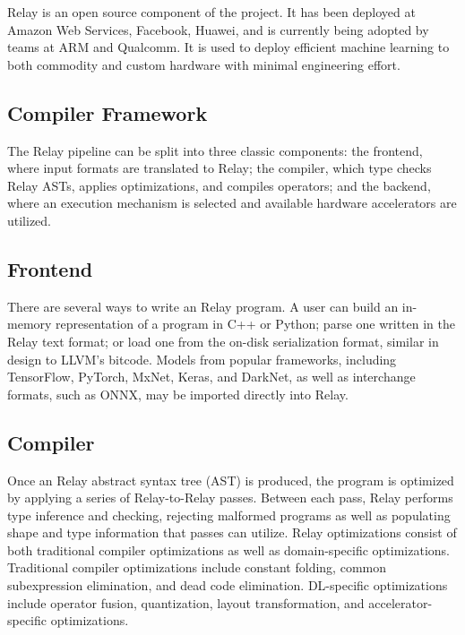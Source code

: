 Relay is an open source component of the \tvm project.
It has been deployed at Amazon Web Services, Facebook, Huawei,
  and is currently being adopted by teams at ARM and Qualcomm.
It is used to deploy efficient machine learning to
  both commodity and custom hardware with minimal
  engineering effort.

\subsection{Compiler Framework}
  The Relay pipeline can be split into three classic components:
    the frontend, where input formats are translated to Relay;
    the compiler, which type checks Relay ASTs, applies optimizations,
      and compiles operators;
    and the backend, where an execution mechanism is selected and
      available hardware accelerators are utilized.

  \subsection{Frontend}

  There are several ways to write an Relay program.
  A user can build an in-memory representation of
    a program in C++ or Python;
    parse one written in the Relay text format;
    or load one from the on-disk serialization format,
    similar in design to LLVM's bitcode.
  Models from popular frameworks, including
    TensorFlow, PyTorch, MxNet, Keras, and DarkNet, as well as interchange
    formats, such as ONNX, may be imported directly into Relay.
  \subsection{Compiler}
  Once an Relay abstract syntax tree (AST) is produced,
    the program is optimized by applying a series of Relay-to-Relay
    passes.
  Between each pass, Relay performs type inference and checking,
    rejecting malformed programs as well as populating shape and type
    information that passes can utilize.
  Relay optimizations consist of both traditional compiler
    optimizations as well as domain-specific optimizations.
  Traditional compiler optimizations include constant folding,
    common subexpression elimination,
    and dead code elimination.
  DL-specific optimizations include
    operator fusion,
    quantization,
    layout transformation,
    and accelerator-specific optimizations.

